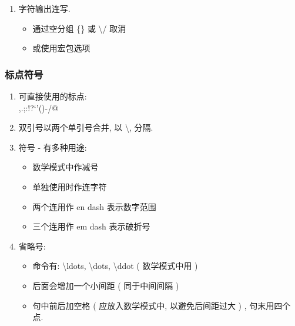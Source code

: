 \documentclass[UTF8]{ctexart}
\begin{document}
\begin{enumerate}
                \item 字符输出连写. 
                \begin{itemize}
                    \item 通过空分组 \{\} 或 \textbackslash/ 取消
                    \item 或使用宏包选项
                \end{itemize}

            \end{enumerate}

        \subsubsection{标点符号}

            \begin{enumerate}

                \item 可直接使用的标点: 
                \\,\quad.\quad;\quad:\quad!\quad?\quad`\quad'\quad(\quad)\quad[\quad]\quad-\quad/\quad*\quad @

                \item 双引号以两个单引号合并, 以 \textbackslash , 分隔. 

                \item 符号 - 有多种用途: 
                \begin{itemize}
                    \item 数学模式中作减号
                    \item 单独使用时作连字符
                    \item 两个连用作 en dash 表示数字范围
                    \item 三个连用作 em dash 表示破折号
                \end{itemize}

                \item 省略号: 
                \begin{itemize}
                    \item 命令有: \textbackslash ldots, \textbackslash dots, \textbackslash ddot ( 数学模式中用 )
                    \item 后面会增加一个小间距 ( 同于中间间隔 )
                    \item 句中前后加空格 ( 应放入数学模式中, 以避免后间距过大 ) , 句末用四个点. 
                \end{itemize}


\end{enumerate}
\end{document}
